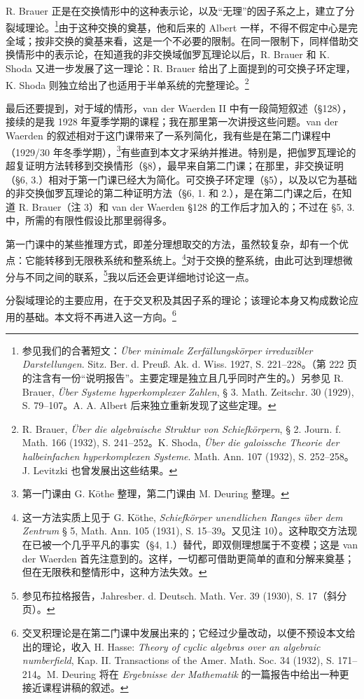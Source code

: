 R. Brauer 正是在交换情形中的这种表示论，以及“无理”的因子系之上，建立了分裂域理论。\footnote{参见我们的合著短文：\emph{Über minimale Zerfällungskörper irreduzibler Darstellungen}. Sitz. Ber. d. Preuß. Ak. d. Wiss. 1927, S. 221--228。（第 222 页的注含有一份“说明报告”。主要定理是独立且几乎同时产生的。）另参见 R. Brauer, \emph{Über Systeme hyperkomplexer Zahlen}, § 3. Math. Zeitschr. 30 (1929), S. 79--107。A. A. Albert 后来独立重新发现了这些定理。}由于这种交换的奠基，他和后来的 Albert 一样，不得不假定中心是完全域；按非交换的奠基来看，这是一个不必要的限制。在同一限制下，同样借助交换情形中的表示论，在知道我的非交换域伽罗瓦理论以后，R. Brauer 和 K. Shoda 又进一步发展了这一理论：R. Brauer 给出了上面提到的可交换子环定理，K. Shoda 则独立给出了也适用于半单系统的完整理论。\footnote{R. Brauer, \emph{Über die algebraische Struktur von Schiefkörpern}, § 2. Journ. f. Math. 166 (1932), S. 241--252。K. Shoda, \emph{Über die galoissche Theorie der halbeinfachen hyperkomplexen Systeme}. Math. Ann. 107 (1932), S. 252--258。J. Levitzki 也曾发展出这些结果。}

最后还要提到，对于域的情形，van der Waerden II 中有一段简短叙述（§128），接续的是我 1928 年夏季学期的课程；我在那里第一次讲授这些问题。van der Waerden 的叙述相对于这门课带来了一系列简化，我有些是在第二门课程中（1929/30 年冬季学期），\footnote{第一门课由 G. Köthe 整理，第二门课由 M. Deuring 整理。}有些直到本文才采纳并推进。特别是，把伽罗瓦理论的超复证明方法转移到交换情形（§8），最早来自第二门课；在那里，非交换证明（§6, 3.）相对于第一门课已经大为简化。可交换子环定理（§5），以及以它为基础的非交换伽罗瓦理论的第二种证明方法（§6, 1. 和 2.），是在第二门课之后，在知道 R. Brauer（注 3）和 van der Waerden §128 的工作后才加入的；不过在 §5, 3. 中，所需的有限性假设比那里弱得多。

第一门课中的某些推理方式，即差分理想取交的方法，虽然较复杂，却有一个优点：它能转移到无限秩系统和整系统上。\footnote{这一方法实质上见于 G. Köthe, \emph{Schiefkörper unendlichen Ranges über dem Zentrum} § 5, Math. Ann. 105 (1931), S. 15--39。又见注 10）。这种取交方法现在已被一个几乎平凡的事实（§4, 1.）替代，即双侧理想属于不变模；这是 van der Waerden 首先注意到的。这样，一切都可借助更简单的直和分解来奠基；但在无限秩和整情形中，这种方法失效。}对于交换的整系统，由此可达到理想微分与不同之间的联系，\footnote{参见布拉格报告，Jahresber. d. Deutsch. Math. Ver. 39 (1930), S. 17（斜分页）。}我以后还会更详细地讨论这一点。

分裂域理论的主要应用，在于交叉积及其因子系的理论；该理论本身又构成数论应用的基础。本文将不再进入这一方向。\footnote{交叉积理论是在第二门课中发展出来的；它经过少量改动，以便不预设本文给出的理论，收入 H. Hasse: \emph{Theory of cyclic algebras over an algebraic numberfield}, Kap. II. Transactions of the Amer. Math. Soc. 34 (1932), S. 171--214。M. Deuring 将在 \emph{Ergebnisse der Mathematik} 的一篇报告中给出一种更接近课程讲稿的叙述。}

